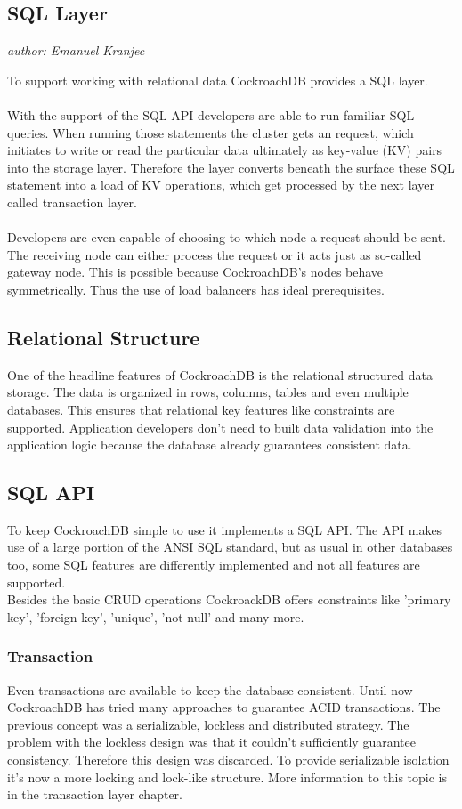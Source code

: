 \subsection{SQL Layer}
\emph{author: Emanuel Kranjec}\bigskip

To support working with relational data CockroachDB provides a SQL layer.\\ \\
With the support of the SQL API developers are able to run familiar SQL queries. When running those statements the cluster gets an request, which initiates to write or read the particular data ultimately as key-value (KV) pairs into the storage layer.
Therefore the layer converts beneath the surface these SQL statement into a load of KV operations, which get processed by the next layer called transaction layer.\\ \\
Developers are even capable of choosing to which node a request should be sent. The receiving node can either process the request or it acts just as so-called gateway node. This is possible because CockroachDB's nodes behave symmetrically. Thus the use of load balancers has ideal prerequisites.

\subsection{Relational Structure}
One of the headline features of CockroachDB is the relational structured data storage. The data is organized in rows, columns, tables and even multiple databases. This ensures that relational key features like constraints are supported. Application developers don't need to built data validation into the application logic because the database already guarantees consistent data.

\subsection{SQL API}
To keep CockroachDB simple to use it implements a SQL API. The API makes use of a large portion of the ANSI SQL standard, but
as usual in other databases too, some SQL features are differently implemented and not all features are supported. \\
Besides the basic CRUD operations CockroackDB offers constraints like 'primary key', 'foreign key', 'unique', 'not null' and
many more.

\subsubsection{Transaction}
Even transactions are available to keep the database consistent. Until now CockroachDB has tried many approaches to guarantee
ACID transactions. The previous concept was a serializable, lockless and distributed strategy. 
The problem with the lockless design was that it couldn't sufficiently guarantee consistency. Therefore this design was 
discarded. To provide serializable isolation it's now a more locking and lock-like structure. 
More information to this topic is in the transaction layer chapter.

